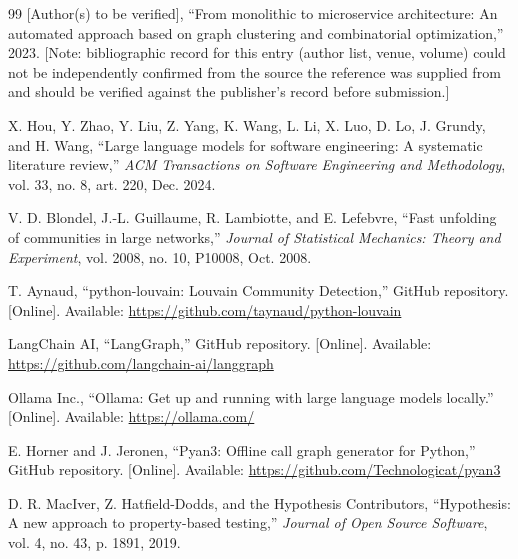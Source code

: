 \documentclass[conference]{IEEEtran}
\begin{document}
\begin{thebibliography}{99}
 [Author(s) to be verified], ``From monolithic to microservice architecture: An automated approach based on graph clustering and combinatorial optimization,'' 2023. [Note: bibliographic record for this entry (author list, venue, volume) could not be independently confirmed from the source the reference was supplied from and should be verified against the publisher's record before submission.]

 X. Hou, Y. Zhao, Y. Liu, Z. Yang, K. Wang, L. Li, X. Luo, D. Lo, J. Grundy, and H. Wang, ``Large language models for software engineering: A systematic literature review,'' \textit{ACM Transactions on Software Engineering and Methodology}, vol. 33, no. 8, art. 220, Dec. 2024.

 V. D. Blondel, J.-L. Guillaume, R. Lambiotte, and E. Lefebvre, ``Fast unfolding of communities in large networks,'' \textit{Journal of Statistical Mechanics: Theory and Experiment}, vol. 2008, no. 10, P10008, Oct. 2008.

 T. Aynaud, ``python-louvain: Louvain Community Detection,'' GitHub repository. [Online]. Available: \url{https://github.com/taynaud/python-louvain}

 LangChain AI, ``LangGraph,'' GitHub repository. [Online]. Available: \url{https://github.com/langchain-ai/langgraph}

 Ollama Inc., ``Ollama: Get up and running with large language models locally.'' [Online]. Available: \url{https://ollama.com/}

 E. Horner and J. Jeronen, ``Pyan3: Offline call graph generator for Python,'' GitHub repository. [Online]. Available: \url{https://github.com/Technologicat/pyan3}

 D. R. MacIver, Z. Hatfield-Dodds, and the Hypothesis Contributors, ``Hypothesis: A new approach to property-based testing,'' \textit{Journal of Open Source Software}, vol. 4, no. 43, p. 1891, 2019.

\end{thebibliography}
\end{document}
